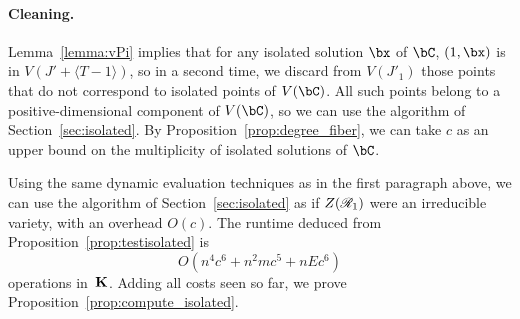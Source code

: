 \documentclass[12pt]{article}
\begin{document}
\paragraph{Cleaning.}
Lemma~\ref{lemma:vPi} implies that for any isolated solution $\bx$ of
$\bC$, $(1,\bx)$ is in $V(J' + \langle T-1\rangle)$, so in a second
time, we discard from $V(J'_1)$ those points that do not correspond to
isolated points of $V(\bC)$. All such points belong to a
positive-dimensional component of $V(\bC)$, so we can use the algorithm
of Section~\ref{sec:isolated}. By Proposition~\ref{prop:degree_fiber},
we can take $c$ as an upper bound on the multiplicity of isolated
solutions of $\bC$.

Using the same dynamic evaluation techniques as in the first paragraph
above, we can use the algorithm of Section~\ref{sec:isolated} as if
$Z(\mathscr{R}_1)$ were an irreducible variety, with an overhead 
$O(c)$. The runtime deduced from Proposition~\ref{prop:testisolated} is
$$O(n^4 c^6 + n^2 m c^5 + n E c^6)$$ operations in~$\mathbf{K}$. Adding all
costs seen so far, we prove Proposition~\ref{prop:compute_isolated}.
\end{document}
